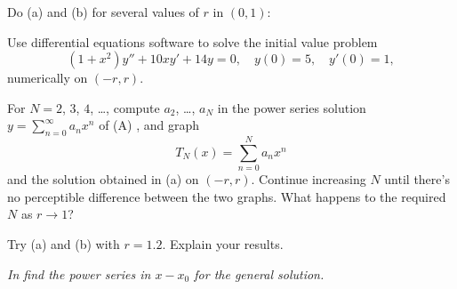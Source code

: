 \begin{exerciselist}
\item\label{exer:7.2.15}\Lex
Do (a) and (b)  for several values of
$r$ in
$(0,1)$:
\begin{alist}
\item %
Use  differential equations software  to solve the initial
value problem
\[
(1+x^2)y''+10xy'+14y=0,\quad y(0)=5,\quad y'(0)=1,\tag{A}
\]
numerically on $(-r,r)$.
\item %
For $N=2$, $3$, $4$, \dots, compute $a_2$, \dots, $a_N$ in the power series
solution
$y=\sum_{n=0}^\infty a_nx^n$ of (A) , and
graph
\[
T_N(x)=\sum_{n=0}^N a_nx^n
\]
and the solution obtained in (a) on $(-r,r)$.
Continue increasing $N$ until there's no perceptible
difference between the two graphs. What  happens to the required $N$
as $r\to1$?
\item %
Try (a) and (b) with $r=1.2$. Explain your results.
\end{alist}
\end{exerciselist}

\textsl{In 
 find the power series in $x-x_0$
for the general solution.}

